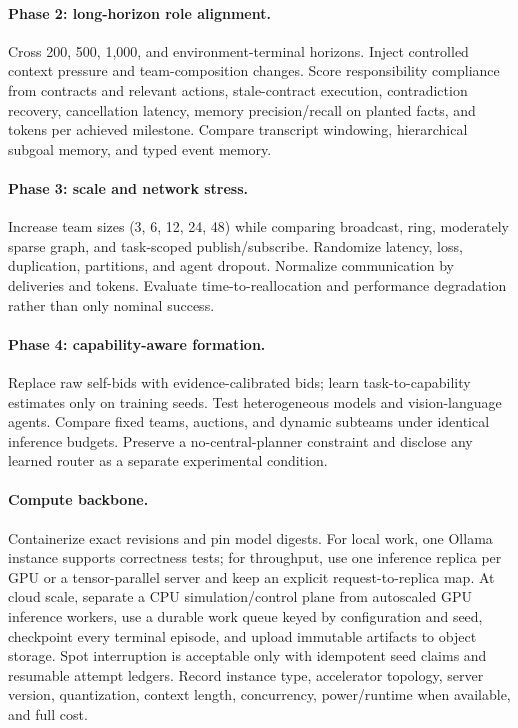 \documentclass[11pt]{article}
\begin{document}
\paragraph{Phase 2: long-horizon role alignment.} Cross 200, 500, 1,000, and environment-terminal horizons. Inject controlled context pressure and team-composition changes. Score responsibility compliance from contracts and relevant actions, stale-contract execution, contradiction recovery, cancellation latency, memory precision/recall on planted facts, and tokens per achieved milestone. Compare transcript windowing, hierarchical subgoal memory, and typed event memory.

\paragraph{Phase 3: scale and network stress.} Increase team sizes (3, 6, 12, 24, 48) while comparing broadcast, ring, moderately sparse graph, and task-scoped publish/subscribe. Randomize latency, loss, duplication, partitions, and agent dropout. Normalize communication by deliveries and tokens. Evaluate time-to-reallocation and performance degradation rather than only nominal success.

\paragraph{Phase 4: capability-aware formation.} Replace raw self-bids with evidence-calibrated bids; learn task-to-capability estimates only on training seeds. Test heterogeneous models and vision-language agents. Compare fixed teams, auctions, and dynamic subteams under identical inference budgets. Preserve a no-central-planner constraint and disclose any learned router as a separate experimental condition.

\paragraph{Compute backbone.} Containerize exact revisions and pin model digests. For local work, one Ollama instance supports correctness tests; for throughput, use one inference replica per GPU or a tensor-parallel server and keep an explicit request-to-replica map. At cloud scale, separate a CPU simulation/control plane from autoscaled GPU inference workers, use a durable work queue keyed by configuration and seed, checkpoint every terminal episode, and upload immutable artifacts to object storage. Spot interruption is acceptable only with idempotent seed claims and resumable attempt ledgers. Record instance type, accelerator topology, server version, quantization, context length, concurrency, power/runtime when available, and full cost.
\end{document}
